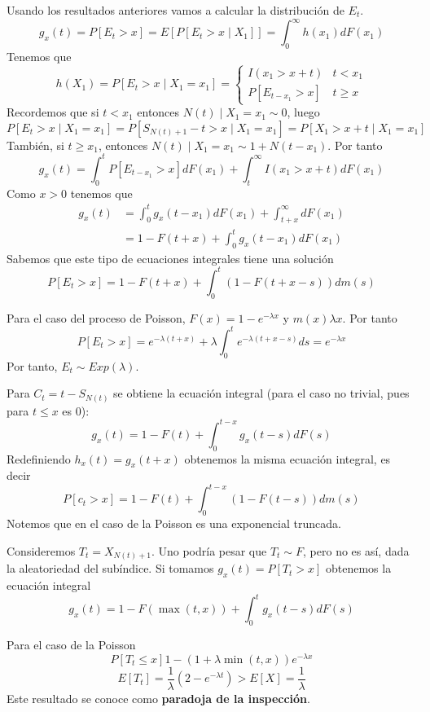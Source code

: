 \documentclass[PREyA.tex]{subfiles}
\begin{document}
\newpage
\begin{example} Usando los resultados anteriores vamos a calcular la distribución de $E_t$. 
$$
g_x(t)= P[E_t>x] = E[P[E_t>x \mid X_1]]  = \int_0^\infty h(x_1)dF(x_1)
$$
Tenemos que
$$
h(X_1)= P[E_t > x \mid X_1 = x_1] = \begin{cases}
I(x_1>x+t) & t< x_1\\
P[E_{t-x_1}>x] & t\geq x
\end{cases}
$$
Recordemos que si $t<x_1$ entonces $N(t)\mid X_1=x_1 \sim 0$, luego
$$
P[E_t>x \mid X_1=x_1] = P[S_{N(t)+1}-t>x\mid X_1=x_1] = P[X_1> x+t \mid X_1= x_1]
$$
También, si $t\geq x_1$, entonces $N(t)\mid X_1=x_1 \sim 1+N(t-x_1)$.
Por tanto
$$
g_x(t) = \int_0^t P[E_{t-x_1}>x]dF(x_1) + \int_t^\infty I(x_1>x+t)dF(x_1)
$$
Como $x>0$ tenemos que
\begin{align*}
g_x(t)&=\int_0^t g_x(t-x_1)dF(x_1) + \int_{t+x}^\infty dF(x_1)\\
&= 1-F(t+x) + \int_0^t g_x(t-x_1)dF(x_1) 
\end{align*}
Sabemos que este tipo de ecuaciones integrales tiene una solución 
$$
P[E_t>x] = 1- F(t+x) + \int_0^t ( 1- F(t+x-s)) dm(s)
$$
\end{example}
\begin{example}
Para el caso del proceso de Poisson, $F(x)= 1-e^{-\lambda x}$ y $m(x)\lambda x$. Por tanto
$$
P[E_t> x] = e^{-\lambda(t+x)} + \lambda \int_0^t e^{-\lambda(t+x-s)}ds = e^{-\lambda x}
$$
Por tanto, $E_t \sim Exp(\lambda)$.
\end{example}
\begin{prop}
Para $C_t = t-S_{N(t)}$ se obtiene la ecuación integral (para el caso no trivial, pues para $t\leq x$ es $0$):
$$
g_x(t) = 1 - F(t) + \int_0^{t-x}g_x(t-s)dF(s)
$$
Redefiniendo $h_x(t)=g_x(t+x)$ obtenemos la misma ecuación integral, es decir
$$
P[c_t > x] = 1- F(t) + \int_0^{t-x}(1-F(t-s))dm(s)
$$
Notemos que en el caso de la Poisson es una exponencial truncada. 
\end{prop}
\begin{prop}
Consideremos $T_t = X_{N(t)+1}$. Uno podría pesar que $T_t \sim F$, pero no es así, dada la aleatoriedad del subíndice. Si tomamos $g_x(t) = P[T_t>x]$ obtenemos la ecuación integral
$$
g_x(t)=1-F(\max(t,x)) + \int_0^t g_x(t-s)dF(s)
$$
\end{prop}
\begin{example}
Para el caso de la Poisson
$$
P[T_t\leq x] 1- (1+\lambda\min(t,x))e^{-\lambda x}
$$
$$
E[T_t] = \frac{1}{\lambda}(2-e^{-\lambda t}) > E[X] = \frac{1}{\lambda}
$$
Este resultado se conoce como \textbf{paradoja de la inspección}.

\end{example}
\end{document}
